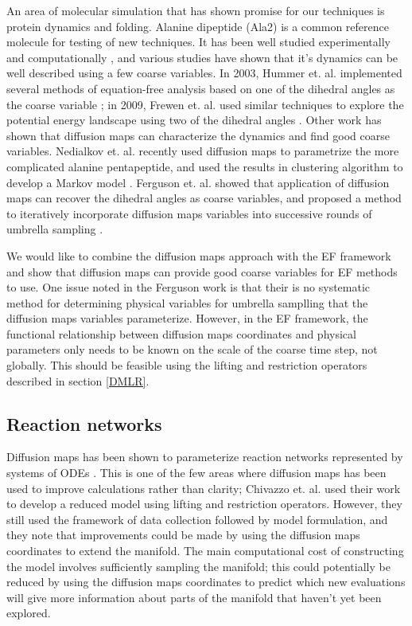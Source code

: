 \documentclass[12pt]{article}
\begin{document}
An area of molecular simulation that has shown promise for our techniques is protein dynamics and folding. Alanine dipeptide (Ala2) is a common reference molecule for testing of new techniques. It has been well studied experimentally and computationally \cite{Wang2014}, and various studies have shown that it's dynamics can be well described using a few coarse variables. In 2003, Hummer et. al. implemented several methods of equation-free analysis based on one of the dihedral angles as the coarse variable \cite{Hummer2003}; in 2009, Frewen et. al. used similar techniques to explore the potential energy landscape using two of the dihedral angles \cite{Frewen2009}. Other work has shown that diffusion maps can characterize the dynamics and find good coarse variables. Nedialkov et. al. recently used diffusion maps to parametrize the more complicated alanine pentapeptide, and used the results in clustering algorithm to develop a Markov model \cite{Nedialkova2014}. Ferguson et. al. showed that application of diffusion maps can recover the dihedral angles as coarse variables, and proposed a method to iteratively incorporate diffusion maps variables into successive rounds of umbrella sampling \cite{Ferguson2011}. \vspace{1mm}

We would like to combine the diffusion maps approach with the EF framework and show that diffusion maps can provide good coarse variables for EF methods to use. One issue noted in the Ferguson work is that their is no systematic method for determining physical variables for umbrella samplling that the diffusion maps variables parameterize. However, in the EF framework, the functional relationship between diffusion maps coordinates and physical parameters only needs to be known on the scale of the coarse time step, not globally. This should be feasible using the lifting and restriction operators described in section \ref{DMLR}.

\subsection{Reaction networks}

Diffusion maps has been shown to parameterize reaction networks represented by systems of ODEs \cite{Chiavazzo2014}. This is one of the few areas where diffusion maps has been used to improve calculations rather than clarity; Chivazzo et. al. used their work to develop a reduced model using lifting and restriction operators. However, they still used the framework of data collection followed by model formulation, and they note that improvements could be made by using the diffusion maps coordinates to extend the manifold. The main computational cost of constructing the model involves sufficiently sampling the manifold; this could potentially be reduced by using the diffusion maps coordinates to predict which new evaluations will give more information about parts of the manifold that haven't yet been explored. \vspace{1mm}
\end{document}
